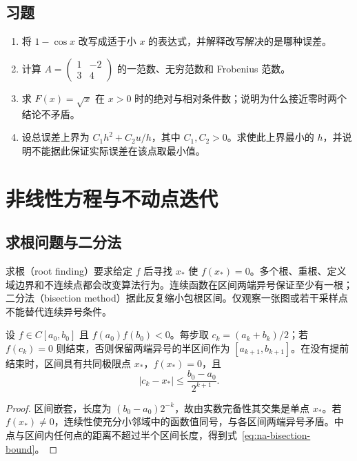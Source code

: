 \documentclass[UTF8,12pt,a4paper,fontset=fandol]{ctexbook}
\begin{document}
\section{习题}
\begin{enumerate}[label=\arabic*.]
\item\label{exr:na-error-rational} 将 $1-\cos x$ 改写成适于小 $x$ 的表达式，并解释改写解决的是哪种误差。
\item\label{exr:na-error-norm} 计算 $A=\begin{pmatrix}1&-2\\3&4\end{pmatrix}$ 的一范数、无穷范数和 Frobenius 范数。
\item\label{exr:na-error-condition} 求 $F(x)=\sqrt x$ 在 $x>0$ 时的绝对与相对条件数；说明为什么接近零时两个结论不矛盾。
\item\label{exr:na-error-balance} 设总误差上界为 $C_1h^2+C_2u/h$，其中 $C_1,C_2>0$。求使此上界最小的 $h$，并说明不能据此保证实际误差在该点取最小值。
\end{enumerate}

\chapter{非线性方程与不动点迭代}
\label{chap:na-roots}

\section{求根问题与二分法}
求根（root finding）要求给定 $f$ 后寻找 $x_*$ 使 $f(x_*)=0$。多个根、重根、定义域边界和不连续点都会改变算法行为。连续函数在区间两端异号保证至少有一根；二分法（bisection method）据此反复缩小包根区间。仅观察一张图或若干采样点不能替代连续异号条件。

\begin{theorem}[二分法的误差界]
设 $f\in C[a_0,b_0]$ 且 $f(a_0)f(b_0)<0$。每步取 $c_k=(a_k+b_k)/2$；若 $f(c_k)=0$ 则结束，否则保留两端异号的半区间作为 $[a_{k+1},b_{k+1}]$。在没有提前结束时，区间具有共同极限点 $x_*$，$f(x_*)=0$，且
\begin{equation}
 |c_k-x_*|\le\frac{b_0-a_0}{2^{k+1}}.
 \label{eq:na-bisection-bound}
\end{equation}
\end{theorem}
\begin{proof}
区间嵌套，长度为 $(b_0-a_0)2^{-k}$，故由实数完备性其交集是单点 $x_*$。若 $f(x_*)\ne0$，连续性使充分小邻域中的函数值同号，与各区间两端异号矛盾。中点与区间内任何点的距离不超过半个区间长度，得到式~\eqref{eq:na-bisection-bound}。
\end{proof}
\end{document}
